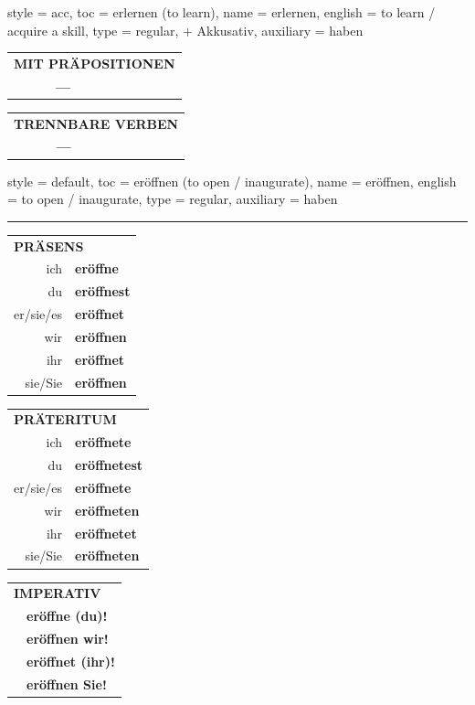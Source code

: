\begin{verbentry}{
  style = {acc},
  toc = {erlernen (to learn)},
  name = {erlernen},
  english = {to learn / acquire a skill},
  type = {regular, + Akkusativ},
  auxiliary = {haben}
}
\vspace{10pt}

\begin{tabular}{lll}
\multicolumn{3}{l}{\textbf{MIT PRÄPOSITIONEN}}\\
& \textbf{---} & \\
\end{tabular}
\hfill
\begin{tabular}{lll}
\multicolumn{3}{l}{\textbf{TRENNBARE VERBEN}}\\
& \textbf{---} & \\
\end{tabular}

\vspace{-5pt}
\end{verbentry}

\begin{verbentry}{
  style = {default},
  toc = {eröffnen (to open / inaugurate)},
  name = {eröffnen},
  english = {to open / inaugurate},
  type = {regular},
  auxiliary = {haben}
}


\vspace{5pt}
\hrule
\vspace{5pt}

\begin{tabular}{rl}
\multicolumn{2}{l}{\textbf{PRÄSENS}}\\
ich & \textbf{eröffne}\\
du & \textbf{eröffnest}\\
er/sie/es & \textbf{eröffnet}\\
wir & \textbf{eröffnen}\\
ihr & \textbf{eröffnet}\\
sie/Sie & \textbf{eröffnen}\\
\end{tabular}
\hfill
\begin{tabular}{rl}
\multicolumn{2}{l}{\textbf{PRÄTERITUM}}\\
ich & \textbf{eröffnete}\\
du & \textbf{eröffnetest}\\
er/sie/es & \textbf{eröffnete}\\
wir & \textbf{eröffneten}\\
ihr & \textbf{eröffnetet}\\
sie/Sie & \textbf{eröffneten}\\
\end{tabular}
\hfill
\begin{tabular}{rl}
\multicolumn{2}{l}{\textbf{IMPERATIV}}\\
& \textbf{eröffne (du)!}\\
& \textbf{eröffnen wir!}\\
& \textbf{eröffnet (ihr)!}\\
& \textbf{eröffnen Sie!}\\
\end{tabular}


\end{verbentry}
